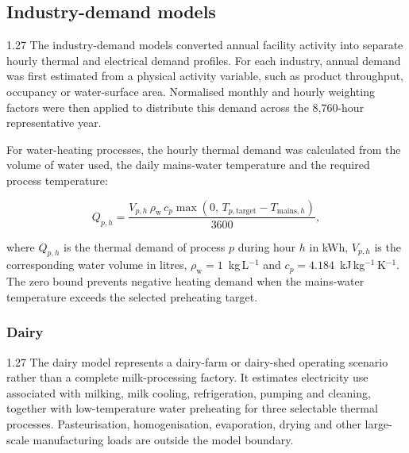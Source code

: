 \documentclass[12pt,letterpaper]{article}
\newcommand{\done}{\ \textcolor{green!45!black}{$\checkmark$}} %
\begin{document}
\subsection{Industry-demand models}\label{sec24}

\begin{spacing}{1.27}
The industry-demand models converted annual facility activity into separate hourly thermal and electrical demand profiles. For each industry, annual demand was first estimated from a physical activity variable, such as product throughput, occupancy or water-surface area. Normalised monthly and hourly weighting factors were then applied to distribute this demand across the 8,760-hour representative year.\par

\vspace{0.15in}

For water-heating processes, the hourly thermal demand was calculated from the volume of water used, the daily mains-water temperature and the required process temperature:

\begin{equation}
Q_{p,h} = \frac{V_{p,h}\,\rho_{\mathrm{w}}\,c_p\max\left(0,\,T_{p,\mathrm{target}}-T_{\mathrm{mains},h}\right)}{3600},
\label{eq:qprocess}
\end{equation}

\noindent where $Q_{p,h}$ is the thermal demand of process $p$ during hour $h$ in kWh, $V_{p,h}$ is the corresponding water volume in litres, $\rho_{\mathrm{w}}=1$~kg\,L$^{-1}$ and $c_p=4.184$~kJ\,kg$^{-1}$\,K$^{-1}$. The zero bound prevents negative heating demand when the mains-water temperature exceeds the selected preheating target.\par
\end{spacing}

\subsubsection[Dairy\done]{Dairy}\label{sec25}

\begin{spacing}{1.27}
The dairy model represents a dairy-farm or dairy-shed operating scenario rather than a complete milk-processing factory. It estimates electricity use associated with milking, milk cooling, refrigeration, pumping and cleaning, together with low-temperature water preheating for three selectable thermal processes. Pasteurisation, homogenisation, evaporation, drying and other large-scale manufacturing loads are outside the model boundary.\par
\end{spacing}
\end{document}
